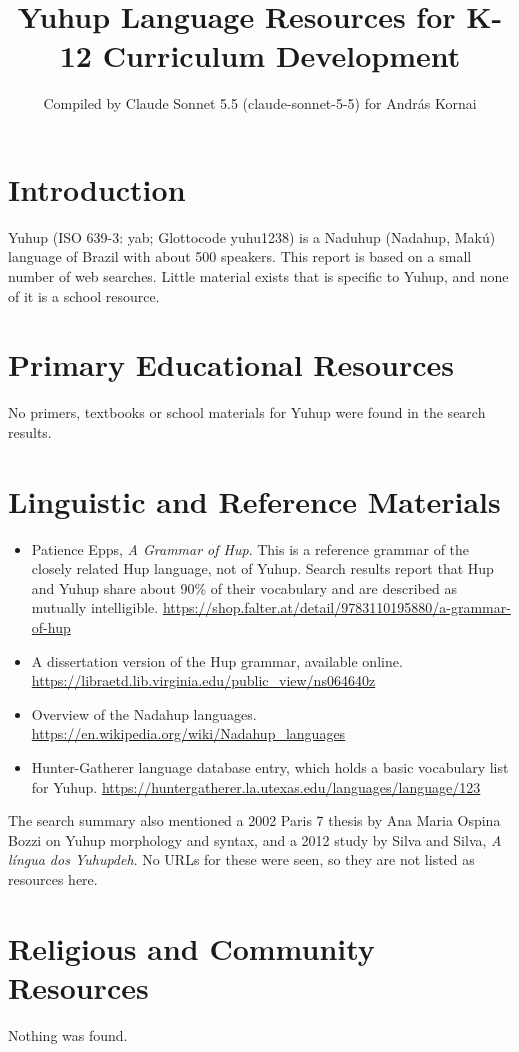 \documentclass[12pt]{article}
\title{Yuhup Language Resources for K-12 Curriculum Development}
\author{Compiled by Claude Sonnet 5.5 (claude-sonnet-5-5) for Andr\'as Kornai}
\date{}
\begin{document}
\maketitle

\section{Introduction}
Yuhup (ISO 639-3: yab; Glottocode yuhu1238) is a Naduhup (Nadahup, Makú) language of Brazil with about 500 speakers. This report is based on a small number of web searches. Little material exists that is specific to Yuhup, and none of it is a school resource.

\section{Primary Educational Resources}
No primers, textbooks or school materials for Yuhup were found in the search results.

\section{Linguistic and Reference Materials}
\begin{itemize}
\item Patience Epps, \textit{A Grammar of Hup}. This is a reference grammar of the closely related Hup language, not of Yuhup. Search results report that Hup and Yuhup share about 90\% of their vocabulary and are described as mutually intelligible. \url{https://shop.falter.at/detail/9783110195880/a-grammar-of-hup}
\item A dissertation version of the Hup grammar, available online. \url{https://libraetd.lib.virginia.edu/public_view/ns064640z}
\item Overview of the Nadahup languages. \url{https://en.wikipedia.org/wiki/Nadahup_languages}
\item Hunter-Gatherer language database entry, which holds a basic vocabulary list for Yuhup. \url{https://huntergatherer.la.utexas.edu/languages/language/123}
\end{itemize}
The search summary also mentioned a 2002 Paris 7 thesis by Ana Maria Ospina Bozzi on Yuhup morphology and syntax, and a 2012 study by Silva and Silva, \textit{A l\'ingua dos Yuhupdeh}. No URLs for these were seen, so they are not listed as resources here.

\section{Religious and Community Resources}
Nothing was found.
\end{document}
